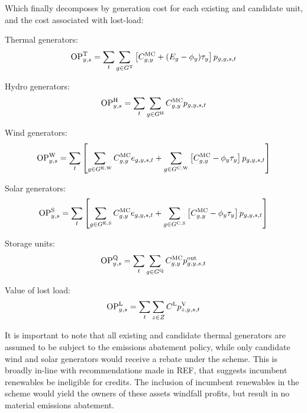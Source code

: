 \documentclass{article}
\begin{document}
Which finally decomposes by generation cost for each existing and candidate unit, and the cost associated with lost-load:

Thermal generators:
\begin{equation}
	\mathrm{OP}^{\mathrm{T}}_{y,s} = \sum\limits_{t} \sum\limits_{g \in G^{\mathrm{T}}} \left[C^{\mathrm{MC}}_{g,y} + (E_{g} - \phi_{y})\tau_{y}\right]p_{g,y,s,t}\\
\end{equation}

Hydro generators:
\begin{equation}
	\mathrm{OP}^{\mathrm{H}}_{y,s} = \sum\limits_{t}\sum\limits_{g \in G^{\mathrm{H}}}C^{\mathrm{MC}}_{g,y} p_{g,y,s,t}
\end{equation}

Wind generators:
\begin{equation}
	\mathrm{OP}^{\mathrm{W}}_{y,s} = \sum\limits_{t}\left[\sum\limits_{g \in G^{\mathrm{E,W}}} C^{\mathrm{MC}}_{g,y} e_{g,y,s,t} + \sum\limits_{g \in G^{\mathrm{C,W}}} \left[C^{\mathrm{MC}}_{g,y} - \phi_{y} \tau_{y}\right] p_{g,y,s,t}\right]
\end{equation}

Solar generators:
\begin{equation}
	\mathrm{OP}^{\mathrm{S}}_{y,s} = \sum\limits_{t}\left[\sum\limits_{g \in G^{\mathrm{E,S}}} C^{\mathrm{MC}}_{g,y} e_{g,y,s,t} + \sum\limits_{g \in G^{\mathrm{C,S}}} \left[C^{\mathrm{MC}}_{g,y} - \phi_{y}\tau_{y}\right] p_{g,y,s,t}\right]
\end{equation}

Storage units:
\begin{equation}
	\mathrm{OP}^{\mathrm{Q}}_{y,s} = \sum\limits_{t}\sum\limits_{g \in G^{\mathrm{Q}}} C^{\mathrm{MC}}_{g,y} p^{\mathrm{out}}_{g,y,s,t}
\end{equation}

Value of lost load:
\begin{equation}
	\mathrm{OP}^{\mathrm{L}}_{y,s} = \sum\limits_{t}\sum\limits_{z \in Z} C^{\mathrm{L}} p^{\mathrm{V}}_{z,y,s,t}
\end{equation}

It is important to note that all existing and candidate thermal generators are assumed to be subject to the emissions abatement policy, while only candidate wind and solar generators would receive a rebate under the scheme. This is broadly in-line with recommendations made in REF, that suggests incumbent renewables be ineligible for credits. The inclusion of incumbent renewables in the scheme would yield the owners of these assets windfall profits, but result in no material emissions abatement.
\end{document}
